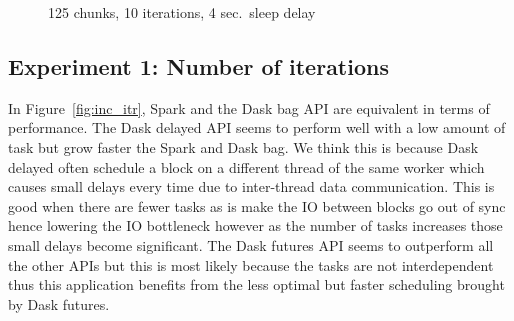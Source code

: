 \documentclass[conference]{IEEEtran}
\begin{document}
\begin{figure}[!t]
    \centering
    
    \caption{125 chunks, 10 iterations, 4 sec.\ sleep delay}\label{fig:inc_worker}
\end{figure}



\subsection{Experiment 1: Number of iterations}
In Figure~\ref{fig:inc_itr}, Spark and the Dask bag API are equivalent in terms of
performance. The Dask delayed API seems to perform well with a low amount of task but
grow faster the Spark and Dask bag. We think this is because Dask delayed often
schedule a block on a different thread of the same worker which causes small delays
every time due to inter-thread data communication. This is good when there are fewer
tasks as is make the IO between blocks go out of sync hence lowering the IO
bottleneck however as the number of tasks increases those small delays become
significant. The Dask futures API seems to outperform all the other APIs but this is
most likely because the tasks are not interdependent thus this application benefits
from the less optimal but faster scheduling brought by Dask futures.
\end{document}
